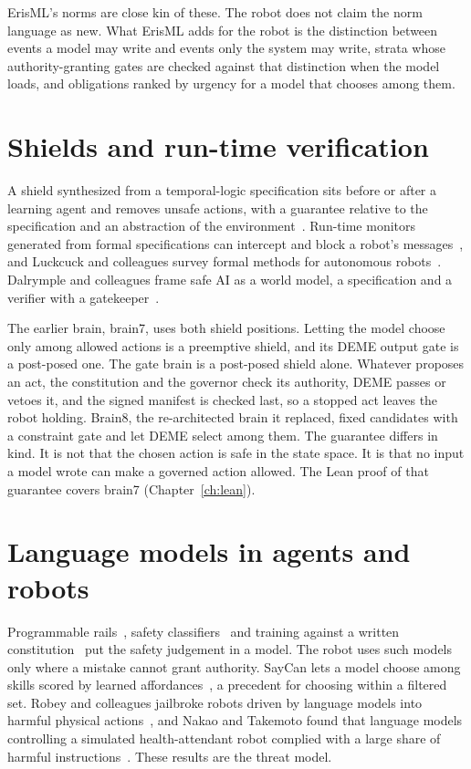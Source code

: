ErisML's norms are close kin of these. The robot does not claim the norm language as new. What
ErisML adds for the robot is the distinction between events a model may write and events only the
system may write, strata whose authority-granting gates are checked against that distinction when
the model loads, and obligations ranked by urgency for a model that chooses among them.

\section{Shields and run-time verification}

A shield synthesized from a temporal-logic specification sits before or after a learning agent and
removes unsafe actions, with a guarantee relative to the specification and an abstraction of the
environment~\cite{bloem2015shield,alshiekh2018shielding}. Run-time monitors generated from formal
specifications can intercept and block a robot's messages~\cite{ferrando2020rosmonitoring}, and
Luckcuck and colleagues survey formal methods for autonomous robots~\cite{luckcuck2019formal}.
Dalrymple and colleagues frame safe AI as a world model, a specification and a verifier with a
gatekeeper~\cite{dalrymple2024guaranteed}.

The earlier brain, brain7, uses both shield positions. Letting the model choose only among allowed
actions is a preemptive shield, and its DEME output gate is a post-posed one. The gate brain is a
post-posed shield alone. Whatever proposes an act, the constitution and the governor check its
authority, DEME passes or vetoes it, and the signed manifest is checked last, so a stopped act
leaves the robot holding. Brain8, the re-architected brain it replaced, fixed candidates with a
constraint gate and let DEME select among them.
The guarantee differs in kind. It is not that the chosen action is safe in the state space. It is
that no input a model wrote can make a governed action allowed. The Lean proof of that guarantee
covers brain7 (Chapter~\ref{ch:lean}).

\section{Language models in agents and robots}

Programmable rails~\cite{rebedea2023nemo}, safety classifiers~\cite{inan2023llamaguard} and
training against a written constitution~\cite{bai2022constitutional} put the safety judgement in a
model. The robot uses such models only where a mistake cannot grant authority. SayCan lets a model
choose among skills scored by learned affordances~\cite{ahn2022saycan}, a precedent for choosing
within a filtered set. Robey and colleagues jailbroke robots driven by language models into
harmful physical actions~\cite{robey2025jailbreaking}, and Nakao and Takemoto found that language
models controlling a simulated health-attendant robot complied with a large share of harmful
instructions~\cite{nakao2026healthattendant}. These results are the threat model.

